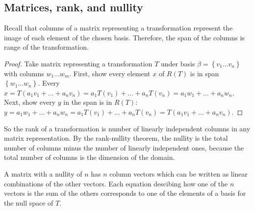 \documentclass{article}
\begin{document}
        \subsection*{Matrices, rank, and nullity}
            Recall that columns of a matrix representing a transformation represent the image of each element of the chosen basis. Therefore, the span of the columns is range of the transformation. 
            \begin{proof}
                Take matrix representing a transformation $T$ under basis $\beta = \left\{v_1 \dots v_n \right\}$ with columns $w_1 \dots w_m$. First, show every element $x$ of $R(T)$ is in span$\left\{w_1 \dots w_n \right\}$. Every $x = T(a_1v_1 + \dots + a_nv_n) = a_1T(v_1) + \dots + a_nT(v_n) = a_1w_1 + \dots + a_nw_n$. Next, show every $y$ in the span is in $R(T)$: $y = a_1 w_1 + \dots + a_n w_n = a_1 T(v_1) + \dots + a_n T(v_n) = T(a_1v_1 + \dots + a_nv_n)$.
            \end{proof}
            So the rank of a transformation is number of linearly independent columns in any matrix representation. By the rank-nullity theorem, the nullity is the total number of columns minus the number of linearly independent ones, because the total number of columns is the dimension of the domain. 

            A matrix with a nullity of $n$ has $n$ column vectors which can be written as linear combinations of the other vectors. Each equation descibing how one of the $n$ vectors is the sum of the others corresponds to one of the elements of a basis for the null space of $T$.
\end{document}
